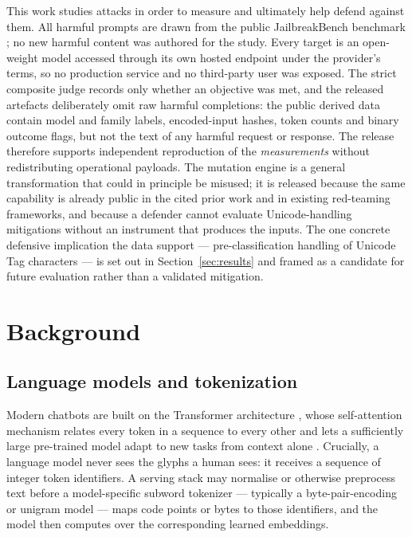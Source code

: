 \documentclass[a4paper,12pt]{article}
\begin{document}
This work studies attacks in order to measure and ultimately help defend against them.
All harmful prompts are drawn from the public JailbreakBench benchmark
\cite{chao2024jbb}; no new harmful content was authored for the study. Every target is
an open-weight model accessed through its own hosted endpoint under the provider's
terms, so no production service and no third-party user was exposed. The strict
composite judge records only whether an objective was met, and the released artefacts
deliberately omit raw harmful completions: the public derived data contain model and
family labels, encoded-input hashes, token counts and binary outcome flags, but not
the text of any harmful request or response. The release therefore supports independent
reproduction of the \emph{measurements} without redistributing operational payloads.
The mutation engine is a general transformation that could in principle be misused; it
is released because the same capability is already public in the cited prior work and
in existing red-teaming frameworks, and because a defender cannot evaluate
Unicode-handling mitigations without an instrument that produces the inputs. The one
concrete defensive implication the data support --- pre-classification handling of
Unicode Tag characters --- is set out in Section~\ref{sec:results} and framed as a
candidate for future evaluation rather than a validated mitigation.

\section{Background}
\label{sec:background}

\subsection{Language models and tokenization}

Modern chatbots are built on the Transformer architecture
\cite{vaswani2017attention}, whose self-attention mechanism relates every token in a
sequence to every other and lets a sufficiently large pre-trained model adapt to new
tasks from context alone \cite{brown2020gpt3}. Crucially, a language model never sees
the glyphs a human sees: it receives a sequence of integer token identifiers. A
serving stack may normalise or otherwise preprocess text before a model-specific
subword tokenizer --- typically a byte-pair-encoding or unigram model
\cite{kudo2018subword} --- maps code points or bytes to those identifiers, and the
model then computes over the corresponding learned embeddings.
\end{document}
